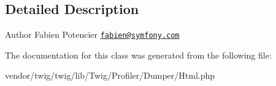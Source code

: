\subsection{Detailed Description}
\begin{DoxyAuthor}{Author}
Fabien Potencier \href{mailto:fabien@symfony.com}{\tt fabien@symfony.\+com} 
\end{DoxyAuthor}


The documentation for this class was generated from the following file\+:\begin{DoxyCompactItemize}
\item 
vendor/twig/twig/lib/\+Twig/\+Profiler/\+Dumper/Html.\+php\end{DoxyCompactItemize}
